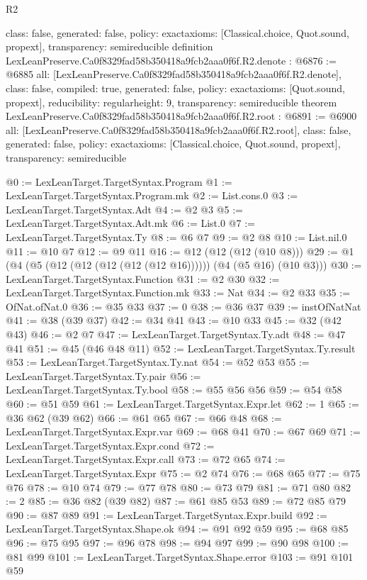 \begin{lexlean}{R2}
\begin{coremodule}
{  class: false,
  generated: false,
  policy: exact{axioms: [Classical.choice, Quot.sound, propext]},
  transparency: semireducible
}
definition LexLeanPreserve.Ca0f8329fad58b350418a9fcb2aaa0f6f.R2.denote : @6876 := @6885 {
  all: [LexLeanPreserve.Ca0f8329fad58b350418a9fcb2aaa0f6f.R2.denote],
  class: false,
  compiled: true,
  generated: false,
  policy: exact{axioms: [Quot.sound, propext]},
  reducibility: regular{height: 9},
  transparency: semireducible
}
theorem LexLeanPreserve.Ca0f8329fad58b350418a9fcb2aaa0f6f.R2.root : @6891 := @6900 {
  all: [LexLeanPreserve.Ca0f8329fad58b350418a9fcb2aaa0f6f.R2.root],
  class: false,
  generated: false,
  policy: exact{axioms: [Classical.choice, Quot.sound, propext]},
  transparency: semireducible
}

@0 := LexLeanTarget.TargetSyntax.Program
@1 := LexLeanTarget.TargetSyntax.Program.mk
@2 := List.cons.{0}
@3 := LexLeanTarget.TargetSyntax.Adt
@4 := @2 @3
@5 := LexLeanTarget.TargetSyntax.Adt.mk
@6 := List.{0}
@7 := LexLeanTarget.TargetSyntax.Ty
@8 := @6 @7
@9 := @2 @8
@10 := List.nil.{0}
@11 := @10 @7
@12 := @9 @11
@16 := @12 (@12 (@12 (@10 @8)))
@29 := @1 (@4 (@5 (@12 (@12 (@12 (@12 (@12 @16)))))) (@4 (@5 @16) (@10 @3)))
@30 := LexLeanTarget.TargetSyntax.Function
@31 := @2 @30
@32 := LexLeanTarget.TargetSyntax.Function.mk
@33 := Nat
@34 := @2 @33
@35 := OfNat.ofNat.{0}
@36 := @35 @33
@37 := 0
@38 := @36 @37
@39 := instOfNatNat
@41 := @38 (@39 @37)
@42 := @34 @41
@43 := @10 @33
@45 := @32 (@42 @43)
@46 := @2 @7
@47 := LexLeanTarget.TargetSyntax.Ty.adt
@48 := @47 @41
@51 := @45 (@46 @48 @11)
@52 := LexLeanTarget.TargetSyntax.Ty.result
@53 := LexLeanTarget.TargetSyntax.Ty.nat
@54 := @52 @53
@55 := LexLeanTarget.TargetSyntax.Ty.pair
@56 := LexLeanTarget.TargetSyntax.Ty.bool
@58 := @55 @56 @56
@59 := @54 @58
@60 := @51 @59
@61 := LexLeanTarget.TargetSyntax.Expr.let
@62 := 1
@65 := @36 @62 (@39 @62)
@66 := @61 @65
@67 := @66 @48
@68 := LexLeanTarget.TargetSyntax.Expr.var
@69 := @68 @41
@70 := @67 @69
@71 := LexLeanTarget.TargetSyntax.Expr.cond
@72 := LexLeanTarget.TargetSyntax.Expr.call
@73 := @72 @65
@74 := LexLeanTarget.TargetSyntax.Expr
@75 := @2 @74
@76 := @68 @65
@77 := @75 @76
@78 := @10 @74
@79 := @77 @78
@80 := @73 @79
@81 := @71 @80
@82 := 2
@85 := @36 @82 (@39 @82)
@87 := @61 @85 @53
@89 := @72 @85 @79
@90 := @87 @89
@91 := LexLeanTarget.TargetSyntax.Expr.build
@92 := LexLeanTarget.TargetSyntax.Shape.ok
@94 := @91 @92 @59
@95 := @68 @85
@96 := @75 @95
@97 := @96 @78
@98 := @94 @97
@99 := @90 @98
@100 := @81 @99
@101 := LexLeanTarget.TargetSyntax.Shape.error
@103 := @91 @101 @59

\end{coremodule}
\end{lexlean}
